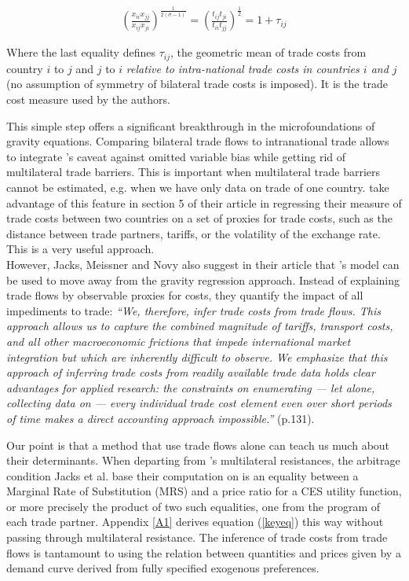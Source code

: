 \documentclass{article}
\begin{document}
\begin{eqnarray}
\left( \frac{x_{ii} x_{jj}}{x_{ij} x_{ji}}\right)^{\frac{1}{2(\sigma-1)}} =\left(\frac{t_{ij} t_{ji}}{t_{ii} t_{jj}} \right)^{\frac{1}{2}} = 1+\tau_{ij} \label{keyeq}
\end{eqnarray}

Where the last equality defines $\tau_{ij}$, the geometric mean
of trade costs from country $i$ to $j$ and $j$ to $i$
\emph{relative to intra-national trade costs in countries $i$
and $j$} (no assumption of symmetry of bilateral trade costs is
imposed). It is the trade cost measure used by the authors.

This simple step offers a significant breakthrough in the
microfoundations of gravity equations. Comparing bilateral
trade flows to intranational trade allows to integrate
\cite{AW2003}'s caveat against omitted variable bias while
getting rid of multilateral trade barriers. This is important
when multilateral trade barriers cannot be estimated, e.g. when
we have only data on trade of one country. \cite{JMN2011} take
advantage of this feature in section 5 of their article in
regressing their measure of trade costs between two countries
on a set of proxies for trade costs, such as the distance
between trade partners, tariffs, or the volatility of the
exchange rate. This is a very useful approach.\\

However, Jacks, Meissner and Novy also suggest in their article that
\cite{AW2003}'s model can be used to move away from the gravity
regression approach. Instead of explaining trade flows by
observable proxies for costs, they quantify the impact of all
impediments to trade: \emph{``We, therefore, infer trade costs
from trade flows. This approach allows us to capture the
combined magnitude of tariffs, transport costs, and all other
macroeconomic frictions that impede international market
integration but which are inherently difficult to observe. We
emphasize that this approach of inferring trade costs from
readily available trade data holds clear advantages for applied
research: the constraints on enumerating — let alone,
collecting data on — every individual trade cost element
even over short periods of time makes a direct accounting
approach impossible.''} (p.131).

Our point is that a method that use trade flows
alone can teach us much about their determinants. When
departing from \cite{AW2003}'s multilateral resistances, the
arbitrage condition Jacks et al. base their computation on is an
equality between a Marginal Rate of Substitution (MRS) and a
price ratio for a CES utility function, or more precisely the
product of two such equalities, one from the program of each
trade partner. Appendix \ref{A1} derives equation (\ref{keyeq})
this way without passing through multilateral resistance. The
inference of trade costs from trade flows is tantamount to
using the relation between quantities and prices given by a
demand curve derived from fully specified exogenous
preferences.
\end{document}
